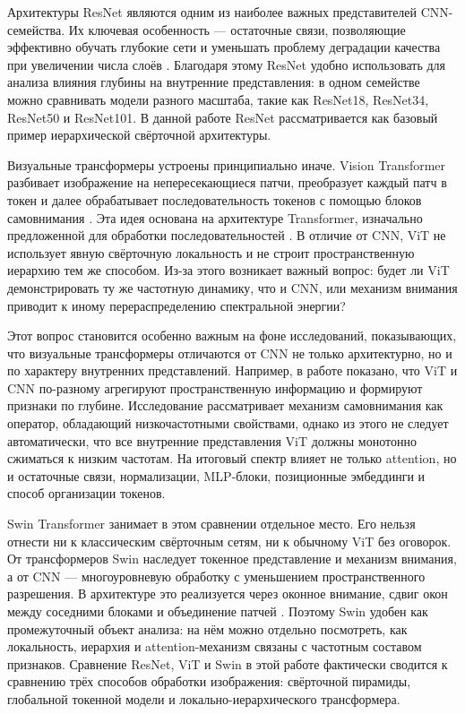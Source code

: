 Архитектуры ResNet являются одним из наиболее важных представителей CNN-семейства. Их ключевая особенность — остаточные связи, позволяющие эффективно обучать глубокие сети и уменьшать проблему деградации качества при увеличении числа слоёв \cite{he2016deep}. Благодаря этому ResNet удобно использовать для анализа влияния глубины на внутренние представления: в одном семействе можно сравнивать модели разного масштаба, такие как ResNet18, ResNet34, ResNet50 и ResNet101. В данной работе ResNet рассматривается как базовый пример иерархической свёрточной архитектуры.

Визуальные трансформеры устроены принципиально иначе. Vision Transformer разбивает изображение на непересекающиеся патчи, преобразует каждый патч в токен и далее обрабатывает последовательность токенов с помощью блоков самовнимания \cite{dosovitskiy2021image}. Эта идея основана на архитектуре Transformer, изначально предложенной для обработки последовательностей \cite{vaswani2017attention}. В отличие от CNN, ViT не использует явную свёрточную локальность и не строит пространственную иерархию тем же способом. Из-за этого возникает важный вопрос: будет ли ViT демонстрировать ту же частотную динамику, что и CNN, или механизм внимания приводит к иному перераспределению спектральной энергии?

Этот вопрос становится особенно важным на фоне исследований, показывающих, что визуальные трансформеры отличаются от CNN не только архитектурно, но и по характеру внутренних представлений. Например, в работе \cite{raghu2021do} показано, что ViT и CNN по-разному агрегируют пространственную информацию и формируют признаки по глубине. Исследование \cite{park2022how} рассматривает механизм самовнимания как оператор, обладающий низкочастотными свойствами, однако из этого не следует автоматически, что все внутренние представления ViT должны монотонно сжиматься к низким частотам. На итоговый спектр влияет не только attention, но и остаточные связи, нормализации, MLP-блоки, позиционные эмбеддинги и способ организации токенов.

Swin Transformer занимает в этом сравнении отдельное место. Его нельзя отнести ни к классическим свёрточным сетям, ни к обычному ViT без оговорок. От трансформеров Swin наследует токенное представление и механизм внимания, а от CNN — многоуровневую обработку с уменьшением пространственного разрешения. В архитектуре это реализуется через оконное внимание, сдвиг окон между соседними блоками и объединение патчей \cite{liu2021swin}. Поэтому Swin удобен как промежуточный объект анализа: на нём можно отдельно посмотреть, как локальность, иерархия и attention-механизм связаны с частотным составом признаков. Сравнение ResNet, ViT и Swin в этой работе фактически сводится к сравнению трёх способов обработки изображения: свёрточной пирамиды, глобальной токенной модели и локально-иерархического трансформера.

